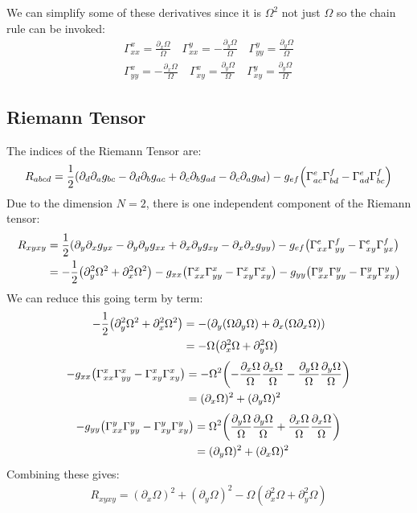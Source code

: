 \documentclass[12pt]{article}
\newcommand{\D}{\partial}
\begin{document}
We can simplify some of these derivatives since it is $\Omega^2$ not just $\Omega$ so the chain rule can be invoked:
\begin{equation*}
  \boxed{
    \begin{aligned}
      \Gamma^{x}_{xx}=\frac{\D_x\Omega}{\Omega}\quad
      \Gamma^{y}_{xx}=-\frac{\D_y\Omega}{\Omega}\quad
      \Gamma^{y}_{yy}=\frac{\D_y\Omega}{\Omega}\\
      \Gamma^{x}_{yy}=-\frac{\D_x\Omega}{\Omega}\quad
      \Gamma^{x}_{xy}=\frac{\D_y\Omega}{\Omega}\quad
      \Gamma^{y}_{xy}=\frac{\D_y\Omega}{\Omega}
    \end{aligned}
  }
\end{equation*}
\subsection{Riemann Tensor}
The indices of the Riemann Tensor are:
\begin{align*}
  R_{abcd}=\frac{1}{2}(\D_d\D_ag_{bc}-\D_d\D_bg_{ac}+\D_c\D_bg_{ad}-\D_c\D_ag_{bd})
  -g_{ef}\qty(\Gamma^e_{ac}\Gamma^f_{bd}-\Gamma^e_{ad}\Gamma^f_{bc})
\end{align*}
Due to the dimension $N=2$, there is one independent component of the Riemann tensor:
\begin{align*}
  R_{xyxy}&=\frac{1}{2}
  \qty(\D_y\D_xg_{yx}-\D_y\D_yg_{xx}+\D_x\D_yg_{xy}-\D_x\D_xg_{yy})
  -g_{ef}\qty(\Gamma^e_{xx}\Gamma^f_{yy}-\Gamma^e_{xy}\Gamma^f_{yx})\\
  &=-\frac{1}{2}\qty(\D^2_y\Omega^2+\D^2_x\Omega^2)
  -g_{xx}\qty(\Gamma^x_{xx}\Gamma^x_{yy}-\Gamma^x_{xy}\Gamma^x_{xy})
  -g_{yy}\qty(\Gamma^y_{xx}\Gamma^y_{yy}-\Gamma^y_{xy}\Gamma^y_{xy})
\end{align*}
We can reduce this going term by term:
\begin{align*}
  -\frac{1}{2}\qty(\D^2_y\Omega^2+\D^2_x\Omega^2)&=
  -\qty(\D_y\qty(\Omega\D_y\Omega)+\D_x(\Omega\D_x\Omega))\\
  &=-\Omega\qty(\D_x^2\Omega+\D_y^2\Omega)
\end{align*}
\begin{align*}
  -g_{xx}\qty(\Gamma^x_{xx}\Gamma^x_{yy}-\Gamma^x_{xy}\Gamma^x_{xy})&=
  -\Omega^2\qty(-\frac{\D_x\Omega}{\Omega}\frac{\D_x\Omega}{\Omega}
  -\frac{\D_y\Omega}{\Omega}\frac{\D_y\Omega}{\Omega})\\
  &=(\D_x\Omega)^2+(\D_y\Omega)^2
\end{align*}
\begin{align*}
  -g_{yy}\qty(\Gamma^y_{xx}\Gamma^y_{yy}-\Gamma^y_{xy}\Gamma^y_{xy})&=
  \Omega^2\qty(\frac{\D_y\Omega}{\Omega}\frac{\D_y\Omega}{\Omega}
  +\frac{\D_x\Omega}{\Omega}\frac{\D_x\Omega}{\Omega})\\
  &=(\D_y\Omega)^2+(\D_x\Omega)^2
\end{align*}
Combining these gives:
\begin{align*}
  \boxed{R_{xyxy}=(\D_x\Omega)^2+(\D_y\Omega)^2
    -\Omega(\D_x^2\Omega+\D_y^2\Omega)}
\end{align*}
\end{document}
